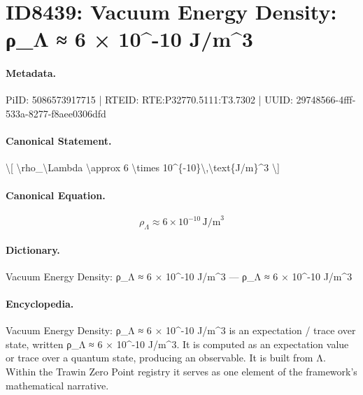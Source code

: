 \section*{ID8439: Vacuum Energy Density: ρ\_Λ ≈ 6 × 10\textasciicircum{}-10 J/m\textasciicircum{}3}
\paragraph{Metadata.}
PiID: 5086573917715 | RTEID: RTE:P32770.5111:T3.7302 | UUID: 29748566-4fff-533a-8277-f8aee0306dfd

\paragraph{Canonical Statement.}
\textbackslash{}[ \textbackslash{}rho\_\textbackslash{}Lambda \textbackslash{}approx 6 \textbackslash{}times 10\textasciicircum{}\{-10\}\textbackslash{},\textbackslash{}text\{J/m\}\textasciicircum{}3 \textbackslash{}]

\paragraph{Canonical Equation.}
\[
\rho_\Lambda \approx 6 \times 10^{-10}\,\text{J/m}^3
\]

\paragraph{Dictionary.}
Vacuum Energy Density: ρ\_Λ ≈ 6 × 10\textasciicircum{}-10 J/m\textasciicircum{}3 — ρ\_Λ ≈ 6 × 10\textasciicircum{}-10 J/m\textasciicircum{}3

\paragraph{Encyclopedia.}
Vacuum Energy Density: ρ\_Λ ≈ 6 × 10\textasciicircum{}-10 J/m\textasciicircum{}3 is an expectation / trace over state, written ρ\_Λ ≈ 6 × 10\textasciicircum{}-10 J/m\textasciicircum{}3. It is computed as an expectation value or trace over a quantum state, producing an observable. It is built from Λ. Within the Trawin Zero Point registry it serves as one element of the framework's mathematical narrative.
